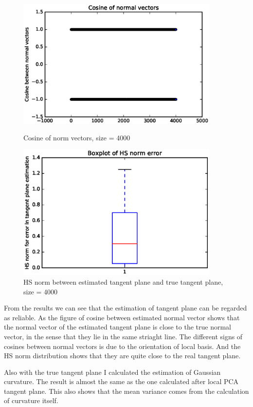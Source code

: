 \documentclass{article}
\begin{document}
\begin{figure}[htbp]
\centering
\begin{minipage}{0.45\textwidth}
\includegraphics[width=0.9\textwidth]{Normcos-size-4000.eps}
\caption{Cosine of norm vectors, size = 4000}
\label{normcos4000}
\end{minipage}
\begin{minipage}{0.45\textwidth}
\includegraphics[width=0.9\textwidth]{HSlpca-size-4000.eps}
\caption{HS norm between estimated tangent plane and true tangent plane, size = 4000}
\label{hsnorm4000}
\end{minipage}
\end{figure}
From the results we can see that the estimation of tangent plane can be regarded as reliable. As the figure of cosine between estimated normal vector shows that the normal vector of the estimated tangent plane is close to the true normal vector, in the sense that  they lie in the same striaght line. The different signs of cosines between normal vectors is due to the orientation of local basis. And the HS norm distribution shows that they are quite close to the real tangent plane.
\par
Also with the true tangent plane I calculated the estimation of Gaussian curvature. The result is almost the same as the one calculated after local PCA tangent plane. This also shows that the mean variance comes from the calculation of curvature itself.
\end{document}
